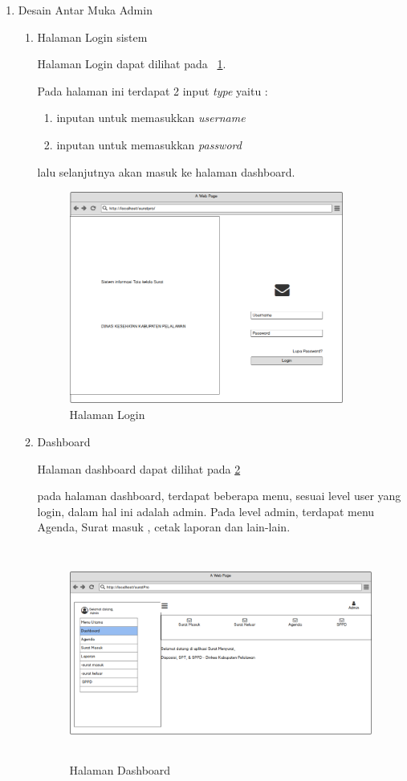 \begin{enumerate}
	
	\item Desain Antar Muka Admin
	
	\begin{enumerate}
		
		\item	Halaman Login sistem
		
		Halaman Login dapat dilihat pada \pic~\ref{HalamanLogin}.
		
		Pada halaman ini terdapat 2 input \textit{type} yaitu :
		\begin{enumerate}
			\item inputan untuk memasukkan \textit{username}
			\item inputan untuk memasukkan \textit{password}
		\end{enumerate}
		lalu selanjutnya akan masuk ke halaman dashboard.
		\begin{figure}
			\centering
			\includegraphics [height= 7cm, width=9cm]{konten/gambar/WireFrameSistemSurat/Admin/HalamanLogin.png}
			\caption{Halaman Login}
			\label{HalamanLogin}
		\end{figure}
		
		\item Dashboard
		
		Halaman dashboard dapat dilihat pada \pic\ref{HalamanDashboard1}
		
		pada halaman dashboard, terdapat beberapa menu, sesuai level user yang login, dalam hal ini adalah admin. Pada level admin, terdapat menu Agenda, Surat masuk , cetak laporan dan lain-lain. 
		\begin{figure}
			\centering
			\includegraphics [height= 7cm, width=11cm]{konten/gambar/WireFrameSistemSurat/Admin/DashBoard.png}
			\caption{Halaman Dashboard}
			\label{HalamanDashboard1}
		\end{figure}
		

\end{enumerate}
\end{enumerate}

